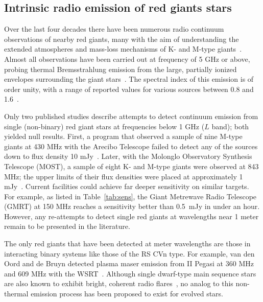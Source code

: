 \documentclass[iop,numberedappendix,apj]{emulateapj}
\begin{document}
\subsection{Intrinsic radio emission of red giants stars}
\label{ss:RGradio}

Over the last four decades there have been numerous radio continuum observations of nearby red giants, many with the aim of understanding the extended atmospheres and mass-loss mechanisms of K- and M-type giants~\citep[e.g.,][]{Newell1982, Knapp1995, Skinner1997, Lim1998, OGorman2013}.
Almost all observations have been carried out 
at frequency of 5 GHz or above, 
probing thermal Bremsstrahlung emission from the large, partially ionized envelopes surrounding the giant stars~\citep{drake1986}.
The spectral index of this emission is of order unity, with a range of reported values for various sources between 0.8 and 1.6~\citep{OGorman2013}.

Only two published studies describe attempts to detect continuum emission from single (non-binary) red giant stars 
at frequencies below 1 GHz ($L$ band); both yielded null results.
First, a program that observed a sample of nine M-type giants at 430 MHz with the Arecibo Telescope failed to detect any of the sources down to flux density 10 mJy~\citep{Fix1976}.
Later, with the Molonglo Observatory Synthesis Telescope (MOST), a sample of eight K- and M-type giants were observed at 843 MHz; the upper limits of their flux densities were placed at approximately 1 mJy~\citep{Beasley1992}.
Current facilities could achieve far deeper sensitivity on similar targets.
For example, as listed in Table~\ref{tab:sens}, the Giant Metrewave Radio Telescope (GMRT) at 150 MHz reaches a sensitivity better than 0.5~mJy in under an hour.
However, any re-attempts to detect single red giants at wavelengths near 1 meter remain to be presented in the literature.

The only red giants that have been detected at meter wavelengths are those in interacting binary systems like those of the RS CVn type.
For example, van den Oord and de Bruyn detected plasma maser emission from II Pegasi at 360 MHz and 609 MHz with the WSRT~\citep{vandenOord1994}.
Although single dwarf-type main sequence stars are also known to exhibit bright, coherent radio flares~\citep{Bastian1990}, no analog to this non-thermal emission process has been proposed to exist for evolved stars.
\end{document}
